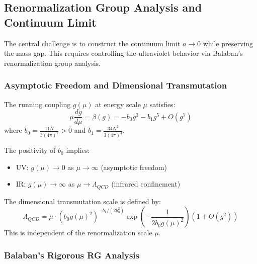 
\subsection{Renormalization Group Analysis and Continuum Limit}
\label{subsec:rg_continuum}

The central challenge is to construct the continuum limit $a \to 0$ while preserving the mass gap. This requires controlling the ultraviolet behavior via Balaban's renormalization group analysis.

\subsubsection{Asymptotic Freedom and Dimensional Transmutation}

\begin{theorem}
\label{thm:asymptotic_freedom}
The running coupling $g(\mu)$ at energy scale $\mu$ satisfies:
\begin{equation}
\mu \frac{dg}{d\mu} = \beta(g) = -b_0 g^3 - b_1 g^5 + O(g^7)
\end{equation}
where $b_0 = \frac{11N}{3(4\pi)^2} > 0$ and $b_1 = \frac{34N^2}{3(4\pi)^4}$.
\end{theorem}

The positivity of $b_0$ implies:
\begin{itemize}
\item UV: $g(\mu) \to 0$ as $\mu \to \infty$ (asymptotic freedom)
\item IR: $g(\mu) \to \infty$ as $\mu \to \Lambda_{QCD}$ (infrared confinement)
\end{itemize}

\begin{definition}
The dimensional transmutation scale is defined by:
\begin{equation}
\Lambda_{QCD} = \mu \cdot (b_0 g(\mu)^2)^{-b_1/(2b_0^2)} \exp\left(-\frac{1}{2b_0 g(\mu)^2}\right) \left(1 + O(g^2)\right)
\end{equation}
This is independent of the renormalization scale $\mu$.
\end{definition}

\subsubsection{Balaban's Rigorous RG Analysis}

